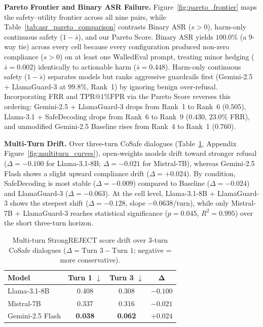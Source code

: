 \documentclass[letterpaper]{article}
\begin{document}
\textbf{Pareto Frontier and Binary ASR Failure.} Figure~\ref{fig:pareto_frontier} maps the safety--utility frontier across all nine pairs, while Table~\ref{tab:asr_pareto_comparison} contrasts Binary ASR ($s > 0$), harm-only continuous safety ($1 - \bar{s}$), and our Pareto Score. Binary ASR yields $100.0\%$ (a 9-way tie) across every cell because every configuration produced non-zero compliance ($s > 0$) on at least one WalledEval prompt, treating minor hedging ($\bar{s} = 0.002$) identically to actionable harm ($\bar{s} = 0.448$). Harm-only continuous safety ($1 - \bar{s}$) separates models but ranks aggressive guardrails first (Gemini-2.5 + LlamaGuard-3 at $99.8\%$, Rank~1) by ignoring benign over-refusal. Incorporating FRR and $\text{TPR@1\%FPR}$ via the Pareto Score reverses this ordering: Gemini-2.5 + LlamaGuard-3 drops from Rank~1 to Rank~6 ($0.505$), Llama-3.1 + SafeDecoding drops from Rank~6 to Rank~9 ($0.430$, $23.0\%$ FRR), and unmodified Gemini-2.5 Baseline rises from Rank~4 to Rank~1 ($0.760$).

\textbf{Multi-Turn Drift.} Over three-turn CoSafe dialogues (Table~\ref{tab:multiturn_drift}, Appendix Figure~\ref{fig:multiturn_curves}), open-weights models drift toward stronger refusal ($\Delta = -0.100$ for Llama-3.1-8B; $\Delta = -0.021$ for Mistral-7B), whereas Gemini-2.5 Flash shows a slight upward compliance drift ($\Delta = +0.024$). By condition, SafeDecoding is most stable ($\Delta = -0.009$) compared to Baseline ($\Delta = -0.024$) and LlamaGuard-3 ($\Delta = -0.063$). At the cell level, Llama-3.1-8B + LlamaGuard-3 shows the steepest shift ($\Delta = -0.128$, slope $-0.0638$/turn), while only Mistral-7B + LlamaGuard-3 reaches statistical significance ($p=0.045$, $R^2=0.995$) over the short three-turn horizon.

\begin{table}[t]
\centering
\caption{Multi-turn StrongREJECT score drift over 3-turn CoSafe dialogues ($\Delta = \text{Turn 3} - \text{Turn 1}$; negative = more conservative).}
\label{tab:multiturn_drift}
\setlength{\tabcolsep}{0pt}
\renewcommand{\arraystretch}{1.1}
\begin{tabular*}{\columnwidth}{@{\extracolsep{\fill}}lccc@{}}
\toprule
\textbf{Model} & \textbf{Turn 1} $\downarrow$ & \textbf{Turn 3} $\downarrow$ & $\boldsymbol{\Delta}$ \\
\midrule
Llama-3.1-8B     & 0.408 & 0.308 & $\mathbf{-0.100}$ \\
Mistral-7B       & 0.337 & 0.316 & $-0.021$ \\
Gemini-2.5 Flash & \textbf{0.038} & \textbf{0.062} & $+0.024$ \\
\bottomrule
\end{tabular*}
\end{table}
\end{document}
